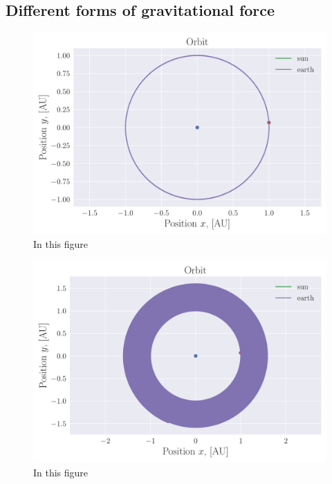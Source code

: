 \documentclass[reprint, english,notitlepage,nofootinbib]{revtex4-1}  %
\begin{document}
\subsection{Different forms of gravitational force}

\begin{figure}[h]
	\centering
	\includegraphics[width=\linewidth]{../output/earth_sun_circ-verlet-3-5-2_75.pdf}
	\caption{In this figure 
		\label{fig:betha=2_75}}
\end{figure}

\begin{figure}[h]
	\centering
	\includegraphics[width=\linewidth]{../output/earth_sun_circ-verlet-3-5-3.pdf}
	\caption{In this figure 
		\label{fig:betha=3}}
\end{figure}
\end{document}

